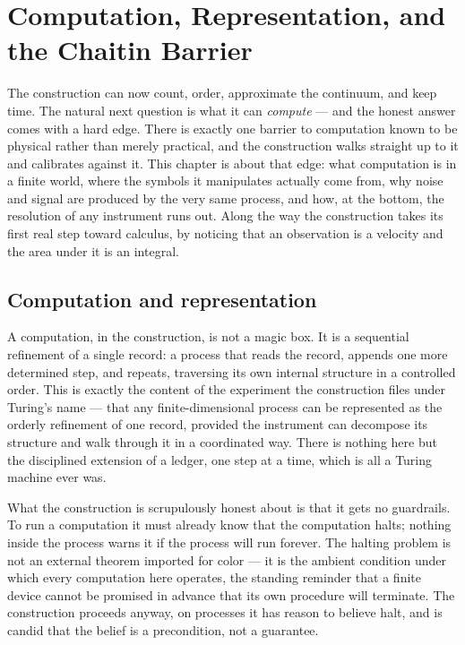 \chapter{Computation, Representation, and the Chaitin Barrier}
\label{chap:computation-chaitin}

The construction can now count, order, approximate the continuum, and keep time. The natural next
question is what it can \emph{compute} --- and the honest answer comes with a hard edge. There is
exactly one barrier to computation known to be physical rather than merely practical, and the
construction walks straight up to it and calibrates against it. This chapter is about that edge: what
computation is in a finite world, where the symbols it manipulates actually come from, why noise and
signal are produced by the very same process, and how, at the bottom, the resolution of any
instrument runs out. Along the way the construction takes its first real step toward calculus, by
noticing that an observation is a velocity and the area under it is an integral.

\section{Computation and representation}
\label{se:computation-and-representation}

A computation, in the construction, is not a magic box. It is a sequential refinement of a single
record: a process that reads the record, appends one more determined step, and repeats, traversing its
own internal structure in a controlled order. This is exactly the content of the experiment the
construction files under Turing's name --- that any finite-dimensional process can be represented as
the orderly refinement of one record, provided the instrument can decompose its structure and walk
through it in a coordinated way. There is nothing here but the disciplined extension of a ledger, one
step at a time, which is all a Turing machine ever was.

What the construction is scrupulously honest about is that it gets no guardrails. To run a computation
it must already know that the computation halts; nothing inside the process warns it if the process
will run forever. The halting problem is not an external theorem imported for color --- it is the
ambient condition under which every computation here operates, the standing reminder that a finite
device cannot be promised in advance that its own procedure will terminate. The construction proceeds
anyway, on processes it has reason to believe halt, and is candid that the belief is a precondition,
not a guarantee.

